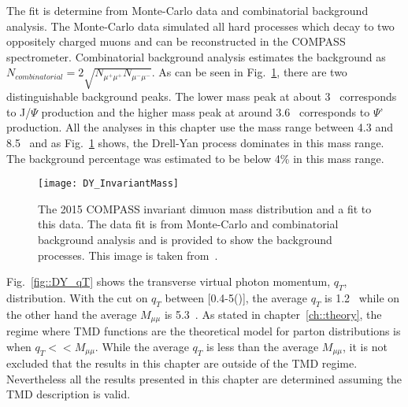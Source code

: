 The fit is determine from Monte-Carlo data and combinatorial background
analysis.  The Monte-Carlo data simulated all hard processes which decay to two
oppositely charged muons and can be reconstructed in the COMPASS spectrometer.
Combinatorial background analysis estimates the background as $N_{combinatorial}
= 2\sqrt{N_{\mu^+\mu^+}N_{\mu^-\mu^-}}$.  As can be seen in
Fig.~\ref{fig::DY_InvariantMass}, there are two distinguishable background
peaks.  The lower mass peak at about 3~{\gvcw} corresponds to J/$\Psi$
production and the higher mass peak at around 3.6~{\gvcw} corresponds to $\Psi$'
production.  All the analyses in this chapter use the mass range between 4.3 and
8.5~{\gvcw} and as Fig.~\ref{fig::DY_InvariantMass} shows, the Drell-Yan process
dominates in this mass range.  The background percentage was estimated to be
below 4\% in this mass range.

\begin{figure}[h!t]
  \centering \texttt{[image: DY\_InvariantMass]}
  \caption{The 2015 COMPASS invariant dimuon mass distribution and a fit to this
    data.  The data fit is from Monte-Carlo and combinatorial background
    analysis and is provided to show the background processes.  This image is
    taken from~\cite{compassDYpaper}.}
  \label{fig::DY_InvariantMass}
\end{figure}

Fig.~\ref{fig::DY_qT} shows the transverse virtual photon momentum, $q_T$,
distribution.  With the cut on $q_T$ between [0.4-5({\gvc})], the average $q_T$
is 1.2~{\gvc} while on the other hand the average $M_{\mu\mu}$ is 5.3~{\gvcw}.
As stated in chapter~\ref{ch::theory}, the regime where TMD functions are the
theoretical model for parton distributions is when $q_T << M_{\mu\mu}$.  While
the average $q_T$ is less than the average $M_{\mu\mu}$, it is not excluded that
the results in this chapter are outside of the TMD regime.  Nevertheless all the
results presented in this chapter are determined assuming the TMD description is
valid.

